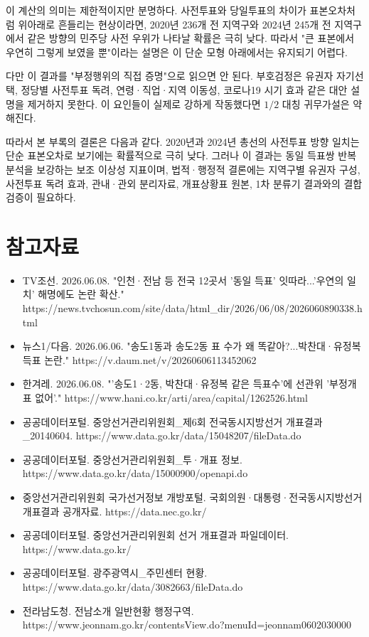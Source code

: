 \documentclass[preprint]{IEIE}
\begin{document}
이 계산의 의미는 제한적이지만 분명하다. 사전투표와 당일투표의 차이가 표본오차처럼 위아래로 흔들리는 현상이라면, 2020년 236개 전 지역구와 2024년 245개 전 지역구에서 같은 방향의 민주당 사전 우위가 나타날 확률은 극히 낮다. 따라서 "큰 표본에서 우연히 그렇게 보였을 뿐"이라는 설명은 이 단순 모형 아래에서는 유지되기 어렵다.

다만 이 결과를 "부정행위의 직접 증명"으로 읽으면 안 된다. 부호검정은 유권자 자기선택, 정당별 사전투표 독려, 연령·직업·지역 이동성, 코로나19 시기 효과 같은 대안 설명을 제거하지 못한다. 이 요인들이 실제로 강하게 작동했다면 \(1/2\) 대칭 귀무가설은 약해진다.

따라서 본 부록의 결론은 다음과 같다. 2020년과 2024년 총선의 사전투표 방향 일치는 단순 표본오차로 보기에는 확률적으로 극히 낮다. 그러나 이 결과는 동일 득표쌍 반복 분석을 보강하는 보조 이상성 지표이며, 법적·행정적 결론에는 지역구별 유권자 구성, 사전투표 독려 효과, 관내·관외 분리자료, 개표상황표 원본, 1차 분류기 결과와의 결합 검증이 필요하다.

\vspace{1em}
\section*{참고자료}

\begin{itemize}
\item TV조선. 2026.06.08. "인천·전남 등 전국 12곳서 '동일 득표' 잇따라...'우연의 일치' 해명에도 논란 확산." https://news.tvchosun.com/site/data/html\_dir/2026/06/08/2026060890338.html
\item 뉴스1/다음. 2026.06.06. "송도1동과 송도2동 표 수가 왜 똑같아?...박찬대·유정복 득표 논란." https://v.daum.net/v/20260606113452062
\item 한겨레. 2026.06.08. "'송도1·2동, 박찬대·유정복 같은 득표수'에 선관위 '부정개표 없어'." https://www.hani.co.kr/arti/area/capital/1262526.html
\item 공공데이터포털. 중앙선거관리위원회\_제6회 전국동시지방선거 개표결과\_20140604. https://www.data.go.kr/data/15048207/fileData.do
\item 공공데이터포털. 중앙선거관리위원회\_투·개표 정보. https://www.data.go.kr/data/15000900/openapi.do
\item 중앙선거관리위원회 국가선거정보 개방포털. 국회의원·대통령·전국동시지방선거 개표결과 공개자료. https://data.nec.go.kr/
\item 공공데이터포털. 중앙선거관리위원회 선거 개표결과 파일데이터. https://www.data.go.kr/
\item 공공데이터포털. 광주광역시\_주민센터 현황. https://www.data.go.kr/data/3082663/fileData.do
\item 전라남도청. 전남소개 일반현황 행정구역. https://www.jeonnam.go.kr/contentsView.do?menuId=jeonnam0602030000
\end{itemize}
\end{document}
